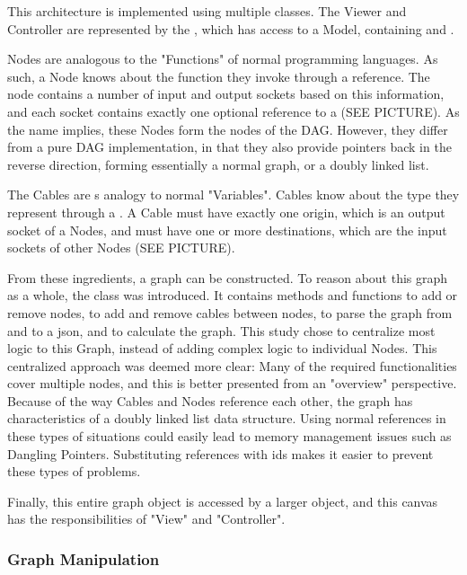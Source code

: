 This architecture is implemented using multiple classes. The Viewer and Controller are represented by the , which has access to a  Model, containing  and . 

Nodes are analogous to the "Functions" of normal programming languages. 
As such, a Node knows about the function they invoke through a  reference. 
The node contains a number of input and output sockets based on this information, and each socket contains exactly one optional reference to a  (SEE PICTURE).  
As the name implies, these Nodes form the nodes of the DAG. However, they differ from a pure DAG implementation, in that they also provide pointers back in the reverse direction, forming essentially a normal graph, or a doubly linked list. 

The Cables are \geofront{}s analogy to normal "Variables". Cables know about the type they represent through a . A Cable must have exactly one origin, which is an output socket of a Nodes, and must have one or more destinations, which are the input sockets of other Nodes (SEE PICTURE).

From these ingredients, a graph can be constructed. 
To reason about this graph as a whole, the  class was introduced. 
It contains methods and functions to add or remove nodes, to add and remove cables between nodes, to parse the graph from and to a json, and to calculate the graph.  
This study chose to centralize most logic to this Graph, instead of adding complex logic to individual Nodes. 
This centralized approach was deemed more clear: Many of the required functionalities cover multiple nodes, and this is better presented from an "overview" perspective.
Because of the way Cables and Nodes reference each other, the graph has characteristics of a doubly linked list data structure. 
Using normal references in these types of situations could easily lead to memory management issues such as Dangling Pointers. 
Substituting references with ids makes it easier to prevent these types of problems. 

Finally, this entire graph object is accessed by a larger  object, and this canvas has the responsibilities of "View" and "Controller". 


\subsubsection*{Graph Manipulation}

